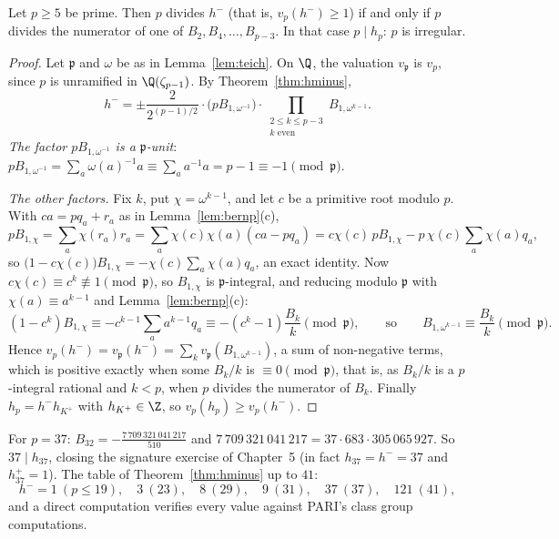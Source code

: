 \begin{theorem}\label{thm:kummercrit}
Let $p\ge5$ be prime. Then $p$ divides $h^-$ (that is, $v_p(h^-)\ge1$) if and only if $p$ divides the numerator of one of $B_2,B_4,\dots,B_{p-3}$.
In that case $p\mid h_p$: $p$ is irregular.
\end{theorem}
\begin{proof}
Let $\mathfrak p$ and $\omega$ be as in Lemma~\ref{lem:teich}. On $\Q$, the valuation $v_{\mathfrak p}$ is $v_p$, since $p$ is unramified in
$\Q(\zeta_{p-1})$. By Theorem~\ref{thm:hminus},
\[
h^-=\pm\frac{2}{2^{(p-1)/2}}\cdot\bigl(pB_{1,\omega^{-1}}\bigr)\cdot\prod_{\substack{2\le k\le p-3\\ k\text{ even}}}B_{1,\omega^{k-1}}.
\]
\emph{The factor $pB_{1,\omega^{-1}}$ is a $\mathfrak p$-unit}: $pB_{1,\omega^{-1}}=\sum_a\omega(a)^{-1}a\equiv\sum_aa^{-1}a=p-1\equiv-1\pmod{\mathfrak p}$.

\emph{The other factors.} Fix $k$, put $\chi=\omega^{k-1}$, and let $c$ be a primitive root modulo $p$. With $ca=pq_a+r_a$ as in
Lemma~\ref{lem:bernp}(c),
\[
pB_{1,\chi}=\sum_a\chi(r_a)r_a=\sum_a\chi(c)\chi(a)(ca-pq_a)=c\chi(c)\,pB_{1,\chi}-p\,\chi(c)\sum_a\chi(a)q_a,
\]
so $\bigl(1-c\chi(c)\bigr)B_{1,\chi}=-\chi(c)\sum_a\chi(a)q_a$, an exact identity. Now $c\chi(c)\equiv c^k\not\equiv1\pmod{\mathfrak p}$, so
$B_{1,\chi}$ is $\mathfrak p$-integral, and reducing modulo $\mathfrak p$ with $\chi(a)\equiv a^{k-1}$ and Lemma~\ref{lem:bernp}(c):
\[
(1-c^k)B_{1,\chi}\equiv-c^{k-1}\sum_aa^{k-1}q_a\equiv-(c^k-1)\frac{B_k}k\pmod{\mathfrak p},\qquad\text{so}\qquad B_{1,\omega^{k-1}}\equiv\frac{B_k}k\pmod{\mathfrak p}.
\]
Hence $v_p(h^-)=v_{\mathfrak p}(h^-)=\sum_kv_{\mathfrak p}(B_{1,\omega^{k-1}})$, a sum of non-negative terms, which is positive exactly when some
$B_k/k$ is $\equiv0\pmod{\mathfrak p}$, that is, as $B_k/k$ is a $p$-integral rational and $k<p$, when $p$ divides the numerator of $B_k$.
Finally $h_p=h^-h_{K^+}$ with $h_{K^+}\in\Z$, so $v_p(h_p)\ge v_p(h^-)$.
\end{proof}

For $p=37$: $B_{32}=-\frac{7\,709\,321\,041\,217}{510}$ and $7\,709\,321\,041\,217=37\cdot683\cdot305\,065\,927$. So $37\mid h_{37}$, closing the
signature exercise of Chapter~5 (in fact $h_{37}=h^-=37$ and $h_{37}^+=1$). The table of Theorem~\ref{thm:hminus} up to $41$:
\[
h^-=1\ (p\le19),\quad 3\ (23),\quad 8\ (29),\quad 9\ (31),\quad 37\ (37),\quad 121\ (41),
\]
and a direct computation verifies every value against PARI's class group computations.

